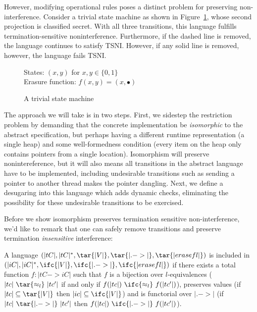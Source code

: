 However, modifying operational rules poses a distinct problem for
preserving non-interference.  Consider a trivial state machine as shown
in Figure~\ref{fig:trivial-sm}, whose second projection is classified
secret.  With all three transitions, this language fulfills
termination-sensitive noninterference.  Furthermore, if the dashed line
is removed, the language continues to satisfy TSNI.  However, if any
solid line is removed, however, the language fails TSNI.

\begin{figure}
    States: $(x,y)$ for $x,y \in \{0,1\}$ \\
    Erasure function: $f(x,y) = (x,\bullet)$

    \begin{center}\end{center}

    \label{fig:trivial-sm}
    \caption{A trivial state machine}
\end{figure}

The approach we will take is in two steps.  First, we sidestep the
restriction problem by demanding that the concrete implementation be
\emph{isomorphic} to the abstract specification, but perhaps having a different
runtime representation (a single heap) and some well-formedness
condition (every item on the heap only contains pointers from a single
location).  Isomorphism will preserve nonintereference, but it will also means all
transitions in the abstract language have to be implemented, including
undesirable transitions such as sending a pointer to another thread makes
the pointer dangling.  Next, we define a desugaring into this language
which adds dynamic checks, eliminating the possibility for these undesirable
transitions to be exercised.


Before we show isomorphism preserves termination sensitive
non-interference, we'd like to remark that one can safely remove transitions
and preserve termination \emph{insensitive} interference:

\begin{definition}
    A language $(|tC|, |tC|^*, \tar{|V|}, \tar{|.->|}, \tar{|erasef l|})$ is
    included in $(|iC|, |iC|^*, \ifc{|V|}, \ifc{|.->|}, \ifc{|erasef
    l|})$ if there exists a total function $f : |tC -> iC|$ such that
    $f$ is a bijection over $l$-equivalences ($|tc|\ \tar{\approx_l}\
    |tc'|$ if and only if $f(|tc|)\ \ifc{\approx_l}\ f(|tc'|)$),
    preserves values (if $|tc| \subseteq \tar{|V|}$ then $|ic| \subseteq
    \ifc{|V|}$) and is functorial over $|.->|$ (if $|tc|\ \tar{|.->|}\
    |tc'|$ then $f(|tc|)\ \ifc{|.->|}\ f(|tc'|)$).
\end{definition}

